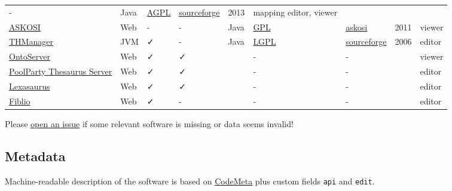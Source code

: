 \documentclass[
  DIV=10]{article}
\begin{document}
\begin{longtable}[]{@{}lllllllll@{}}
- & Java & \href{https://spdx.org/licenses/AGPL-3.0-or-later}{AGPL} &
\href{https://sourceforge.net/projects/coma-ce/}{sourceforge} & 2013 &
mapping editor, viewer \\
\href{http://www.askosi.org/}{ASKOSI} & Web & - & - & Java &
\href{https://spdx.org/licenses/GPL-3.0-or-later}{GPL} &
\href{http://www.askosi.org/example/}{askosi} & 2011 & viewer \\
\href{https://thmanager.sourceforge.io/}{THManager} & JVM & ✓ & - & Java
& \href{https://spdx.org/licenses/LGPL-3.0-or-later}{LGPL} &
\href{https://sourceforge.net/projects/thmanager/}{sourceforge} & 2006 &
editor \\
\href{https://ontoserver.csiro.au/}{OntoServer} & Web & ✓ & ✓ & & - & -
& & viewer \\
\href{https://www.poolparty.biz/poolparty-thesaurus-manager}{PoolParty
Thesaurus Server} & Web & ✓ & ✓ & & - & - & & editor \\
\href{http://www.k-int.com/products/lexaurus/}{Lexasaurus} & Web & ✓ & ✓
& & - & - & & editor \\
\href{https://www.fiblio.de/}{Fiblio} & Web & ✓ & - & & - & - & &
editor \\

\end{longtable}

Please
\href{https://github.com/gbv/bartoc-vocabulary-software/issues}{open an
issue} if some relevant software is missing or data seems invalid!

\newpage
{}
\recalctypearea

\subsection{Metadata}\label{metadata}

Machine-readable description of the software is based on
\href{https://codemeta.github.io/}{CodeMeta} plus custom fields
\texttt{api} and \texttt{edit}.
\end{document}
